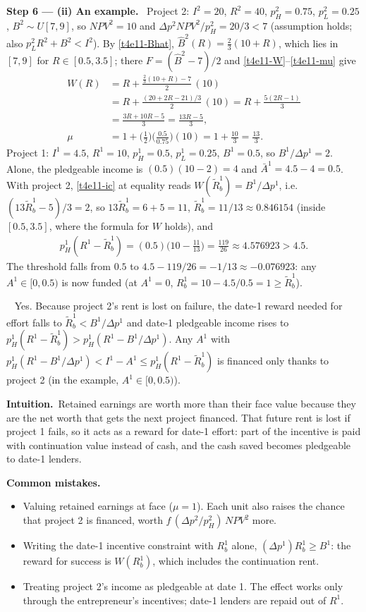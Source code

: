 \documentclass[11pt,a4paper]{article}
\newcommand{\step}[2]{\par\medskip\noindent\textbf{Step #1 --- #2.}~}
\newcommand{\intuition}{\par\medskip\noindent\textbf{Intuition.}~}
\newcommand{\answer}[1]{\par\smallskip\noindent\fbox{\textbf{Answer #1.}}~}
\newcommand{\pitfalls}{\par\medskip\noindent\textbf{Common mistakes.}}
\begin{document}
\step{6}{(ii) An example} Project 2: $I^2=20$, $R^2=40$, $p_H^2=0.75$, $p_L^2=0.25$, $B^2\sim U[7,9]$,
so $\mathit{NPV}^2=10$ and $\Delta p^2\mathit{NPV}^2/p_H^2=20/3<7$ (assumption holds; also $p_L^2R^2+B^2<I^2$).
By \eqref{t4e11-Bhat}, $\hat B^2(R)=\tfrac23(10+R)$, which lies in $[7,9]$ for $R\in[0.5,3.5]$; there
$F=(\hat B^2-7)/2$ and \eqref{t4e11-W}--\eqref{t4e11-mu} give
\begin{align}
  W(R) &= R+\frac{\tfrac23(10+R)-7}{2}\,(10) \nonumber\\
       &= R+\frac{(20+2R-21)/3}{2}\,(10) = R+\frac{5(2R-1)}{3} \nonumber\\
       &= \frac{3R+10R-5}{3}=\frac{13R-5}{3}, \nonumber\\
  \mu &= 1+\Big(\frac12\Big)\Big(\frac{0.5}{0.75}\Big)(10)=1+\frac{10}{3}=\frac{13}{3}. \nonumber
\end{align}
Project 1: $I^1=4.5$, $R^1=10$, $p_H^1=0.5$, $p_L^1=0.25$, $B^1=0.5$, so $B^1/\Delta p^1=2$. Alone, the
pledgeable income is $(0.5)(10-2)=4$ and $\bar A^1=4.5-4=0.5$. With project 2, \eqref{t4e11-ic} at
equality reads $W(\tilde R_b^1)=B^1/\Delta p^1$, i.e.\ $(13\tilde R_b^1-5)/3=2$, so
$13\tilde R_b^1=6+5=11$, $\tilde R_b^1=11/13\approx0.846154$ (inside $[0.5,3.5]$, where the formula
for $W$ holds), and
\begin{align}
  p_H^1(R^1-\tilde R_b^1) = (0.5)\Big(10-\frac{11}{13}\Big)=\frac{119}{26}\approx 4.576923 > 4.5. \nonumber
\end{align}
The threshold falls from $0.5$ to $4.5-119/26=-1/13\approx-0.076923$: any $A^1\in[0,0.5)$ is now funded
(at $A^1=0$, $R_b^1=10-4.5/0.5=1\ge\tilde R_b^1$).

\answer{(ii)} Yes. Because project 2's rent is lost on failure, the date-1 reward needed for effort
falls to $\tilde R_b^1<B^1/\Delta p^1$ and date-1 pledgeable income rises to
$p_H^1(R^1-\tilde R_b^1)>p_H^1(R^1-B^1/\Delta p^1)$. Any $A^1$ with
$p_H^1(R^1-B^1/\Delta p^1)<I^1-A^1\le p_H^1(R^1-\tilde R_b^1)$ is financed only thanks to project 2
(in the example, $A^1\in[0,0.5)$).

\intuition Retained earnings are worth more than their face value because they are the net worth that
gets the next project financed. That future rent is lost if project 1 fails, so it acts as a reward for
date-1 effort: part of the incentive is paid with continuation value instead of cash, and the cash
saved becomes pledgeable to date-1 lenders.

\pitfalls
\begin{itemize}
  \item Valuing retained earnings at face ($\mu=1$). Each unit also raises the chance that project 2 is
        financed, worth $f\,(\Delta p^2/p_H^2)\,\mathit{NPV}^2$ more.
  \item Writing the date-1 incentive constraint with $R_b^1$ alone, $(\Delta p^1)R_b^1\ge B^1$: the
        reward for success is $W(R_b^1)$, which includes the continuation rent.
  \item Treating project 2's income as pledgeable at date 1. The effect works only through the
        entrepreneur's incentives; date-1 lenders are repaid out of $R^1$.
\end{itemize}
\end{document}
